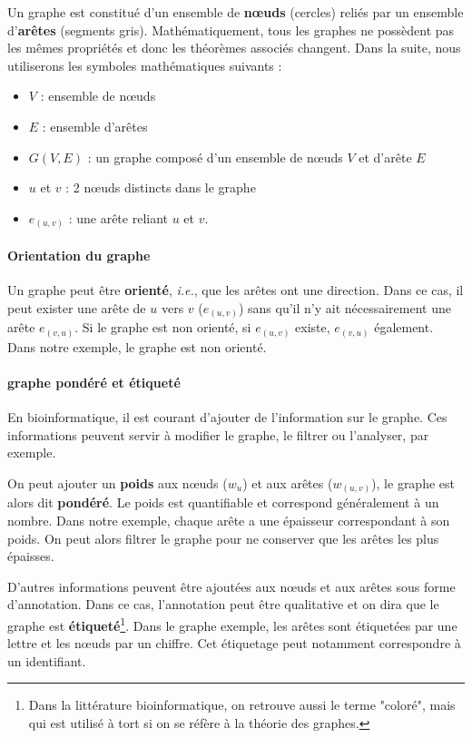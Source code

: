 Un graphe est constitué d'un ensemble de \textbf{n\oe uds} (cercles) reliés par un ensemble d'\textbf{arêtes} (segments gris). Mathématiquement, tous les graphes ne possèdent pas les mêmes propriétés et donc les théorèmes associés changent. Dans la suite, nous utiliserons les symboles mathématiques suivants :
\begin{itemize}
    \item $V$ : ensemble de n\oe uds
    \item $E$ : ensemble d'arêtes
    \item $G(V, E)$ : un graphe composé d'un ensemble de n\oe uds $V$ et d'arête $E$
    \item $u$ et $v$ : 2 n\oe uds distincts dans le graphe
    \item $e_{(u,v)}$ : une arête reliant $u$ et $v$.
\end{itemize}

\paragraph{Orientation du graphe}

Un graphe peut être \textbf{orienté}, \textit{i.e.}, que les arêtes ont une direction. Dans ce cas, il peut exister une arête de $u$ vers $v$ ($e_{(u, v)}$) sans qu'il n'y ait nécessairement une arête $e_{(v, u)}$. Si le graphe est non orienté, si $e_{(u, v)}$ existe, $e_{(v, u)}$ également. Dans notre exemple, le graphe est non orienté.

\paragraph{graphe pondéré et étiqueté}

En bioinformatique, il est courant d'ajouter de l'information sur le graphe. Ces informations peuvent servir à modifier le graphe, le filtrer ou l'analyser, par exemple.

On peut ajouter un \textbf{poids} aux n\oe uds ($w_u$) et aux arêtes ($w_{(u,v)}$), le graphe est alors dit \textbf{pondéré}. Le poids est quantifiable et correspond généralement à un nombre. Dans notre exemple, chaque arête a une épaisseur correspondant à son poids. On peut alors filtrer le graphe pour ne conserver que les arêtes les plus épaisses.

D'autres informations peuvent être ajoutées aux n\oe uds et aux arêtes sous forme d'annotation. Dans ce cas, l'annotation peut être qualitative et on dira que le graphe est \textbf{étiqueté}\footnote{Dans la littérature bioinformatique, on retrouve aussi le terme "coloré", mais qui est utilisé à tort si on se réfère à la théorie des graphes.}. Dans le graphe exemple, les arêtes sont étiquetées par une lettre et les n\oe uds par un chiffre. Cet étiquetage peut notamment correspondre à un identifiant.

